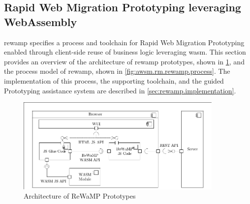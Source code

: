 \vspace{-10pt}
\hypertarget{sec:rewamp.wasm}{%
\subsection{Rapid Web Migration Prototyping leveraging \\ WebAssembly}\label{sec:rewamp.wasm}}
\vspace{10pt}

\gls{rewamp} \autocite{Heil2018ReWaMP} specifies a process and toolchain for \gls{Rapid Web Migration Prototyping} enabled through client-side reuse of business logic leveraging \gls{wasm}.
This section provides an overview of the architecture of \gls{rewamp} prototypes, shown in \cref{fig:awsm.rm.rewamp.architecture}, and the  process model of \gls{rewamp}, shown in \cref{fig:awsm.rm.rewamp.process}.
The implementation of this process, the supporting toolchain, and the guided \gls{Prototyping} assistance system are described in \cref{sec:rewamp.implementation}.
\begin{figure}[h!]
\hypertarget{fig:awsm.rm.rewamp.architecture}{%
\centering
\includegraphics[width=0.9\textwidth]{../figures/rewamp/rewamp-prototype-architecture.pdf}
\caption[Architecture of ReWaMP Prototypes]{Architecture of ReWaMP Prototypes \\\autocite[adapted from][]{Heil2018ReWaMP}}\label{fig:awsm.rm.rewamp.architecture}
}
\end{figure}

